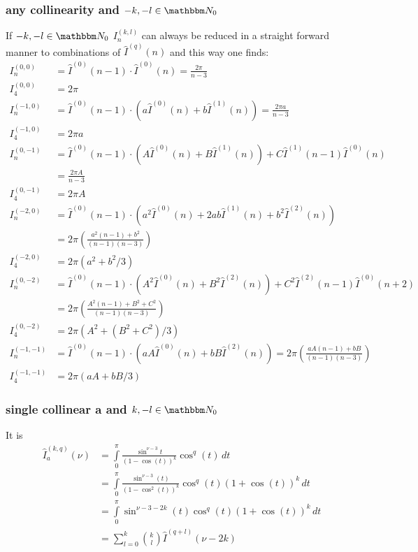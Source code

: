 \subsubsection{any collinearity and $-k,-l\in\mathbbm N_0$}
If $-k,-l\in\mathbbm N_0$ $I_{n}^{(k,l)}$ can always be reduced in a straight forward manner to combinations of $\hat I^{(q)}(n)$ and this way one finds\cite[Ch. 5]{Bojak:2000eu}\cite[App. C]{PhysRevD.40.54}:
\begin{align}
I^{(0,0)}_{n} &= \hat I^{(0)}(n-1) \cdot \hat I^{(0)}(n) = \frac{2\pi}{n-3}\\
I^{(0,0)}_{4} &= 2\pi\\
I^{(-1,0)}_{n} &= \hat I^{(0)}(n-1) \cdot (a\hat I^{(0)}(n)+b\hat I^{(1)}(n)) = \frac{2\pi a}{n-3}\\
I^{(-1,0)}_{4} &= 2\pi a \\
I^{(0,-1)}_{n} &= \hat I^{(0)}(n-1) \cdot (A\hat I^{(0)}(n) + B\hat I^{(1)}(n)) + C\hat I^{(1)}(n-1)\hat I^{(0)}(n)\\
 &= \frac{2\pi A}{n-3}\\
I^{(0,-1)}_{4} &=2\pi A\\
I^{(-2,0)}_{n} &= \hat I^{(0)}(n-1) \cdot (a^2\hat I^{(0)}(n)+2ab\hat I^{(1)}(n) + b^2 \hat I^{(2)}(n))\\
 &= 2\pi\left(\frac{a^2(n-1)+b^2}{(n-1)(n-3)}\right)\\
I^{(-2,0)}_{4} &= 2\pi(a^2 + b^2/3) \\
I^{(0,-2)}_{n} &= \hat I^{(0)}(n-1) \cdot (A^2\hat I^{(0)}(n) + B^2\hat I^{(2)}(n)) + C^2\hat I^{(2)}(n-1)\hat I^{(0)}(n+2) \\
 &= 2\pi\left(\frac{A^2(n-1)+B^2+C^2}{(n-1)(n-3)}\right)\\
I^{(0,-2)}_{4} &= 2\pi(A^2+(B^2+C^2)/3) \\
I^{(-1,-1)}_{n} &= \hat I^{(0)}(n-1) \cdot (a A\hat I^{(0)}(n) + b B \hat I^{(2)}(n)) = 2\pi\left(\frac{aA(n-1)+bB}{(n-1)(n-3)}\right)\\
I^{(-1,-1)}_{4} &= 2\pi(aA + bB/3)
\end{align}

\subsubsection{single collinear a and $k,-l\in \mathbbm N_0$}
It is
\begin{align}
\hat I_{a}^{(k,q)}(\nu) &= \int\limits_0^\pi\!\frac{\sin^{\nu-3}t}{(1-\cos(t))^k}\cos^q(t)\, dt \\
 &= \int\limits_0^\pi\!\frac{\sin^{\nu-3}(t)}{(1-\cos^2(t))^k}\cos^q(t)(1+\cos(t))^k\, dt\\
 &=\int\limits_0^\pi\!\sin^{\nu-3-2k}(t)\cos^q(t)(1+\cos(t))^k\, dt\\
 &= \sum\limits_{l=0}^k\binom{k}{l}\hat I^{(q+l)}(\nu-2k)
\end{align}

